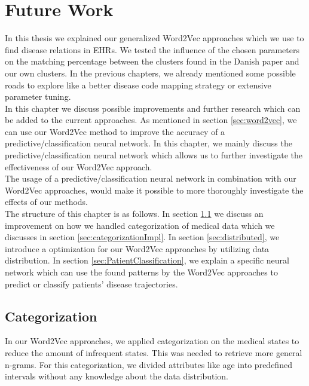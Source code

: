 \graphicspath{ {FutureWork/Images/} }


\chapter{Future Work}
\label{cha:futureWork}

In this thesis we explained our generalized Word2Vec approaches which we use to find disease relations in EHRs. We tested the influence of the chosen parameters on the matching percentage between the clusters found in the Danish paper and our own clusters. In the previous chapters, we already mentioned some possible roads to explore like a better disease code mapping strategy or extensive parameter tuning. \\

In this chapter we discuss possible improvements and further research which can be added to the current approaches. As mentioned in section \ref{sec:word2vec}, we can use our Word2Vec method to improve the accuracy of a predictive/classification neural network. In this chapter, we mainly discuss the predictive/classification neural network which allows us to further investigate the effectiveness of our Word2Vec approach. \\
The usage of a predictive/classification neural network in combination with our Word2Vec approaches, would make it possible to more thoroughly investigate the effects of our methods. \\

The structure of this chapter is as follows. In section \ref{sec:categorization} we discuss an improvement on how we handled categorization of medical data which we discusses in section \ref{sec:categorizationImpl}. In section \ref{sec:distributed}, we introduce a optimization for our Word2Vec approaches by utilizing data distribution. In section \ref{sec:PatientClassification}, we explain a specific neural network which can use the found patterns by the Word2Vec approaches to predict or classify patients' disease trajectories.


\section{Categorization}
\label{sec:categorization}

In our Word2Vec approaches, we applied categorization on the medical states to reduce the amount of infrequent states. This was needed to retrieve more general n-grams. For this categorization, we divided attributes like age into predefined intervals without any knowledge about the data distribution. \\

